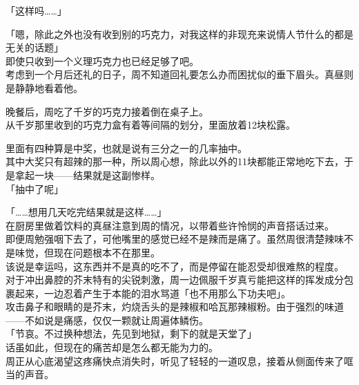「这样吗……」

「嗯，除此之外也没有收到别的巧克力，对我这样的非现充来说情人节什么的都是无关的话题」\\

即使只收到一个义理巧克力也已经足够了吧。\\

考虑到一个月后还礼的日子，周不知道回礼要怎么办而困扰似的垂下眉头。真昼则是静静地看着他。\\

\vspace{2\baselineskip}

晚餐后，周吃了千岁的巧克力接着倒在桌子上。\\

从千岁那里收到的巧克力盒有着等间隔的划分，里面放着12块松露。

里面有四种算是中奖，也就是说有三分之一的几率抽中。\\

其中大奖只有超辣的那一种，所以周心想，除此以外的11块都能正常地吃下去，于是拿起一块——结果就是这副惨样。\\

「抽中了呢」

「……想用几天吃完结果就是这样……」\\

在厨房里做着饮料的真昼注意到周的情况，以带着些许怜悯的声音搭话过来。\\

即便周勉强咽下去了，可他嘴里的感觉已经不是辣而是痛了。虽然周很清楚辣味不是味觉，但现在问题根本不在那里。\\

该说是幸运吗，这东西并不是真的吃不了，而是停留在能忍受却很难熬的程度。\\

对于冲出鼻腔的芥末特有的尖锐刺激，周一边佩服千岁真亏能把这样的挥发成分包裹起来，一边忍着产生于本能的泪水骂道「也不用那么下功夫吧」。\\

攻击鼻子和眼睛的是芥末，灼烧舌头的是辣椒和哈瓦那辣椒粉。由于强烈的味道——不如说是痛感，仅仅一颗就让周遍体鳞伤。\\

「节哀。不过换种想法，先见到地狱，剩下的就是天堂了」\\

话虽如此，但现在的痛苦却是怎么都无能为力的。\\

周正从心底渴望这疼痛快点消失时，听见了轻轻的一道叹息，接着从侧面传来了哐当的声音。\\

